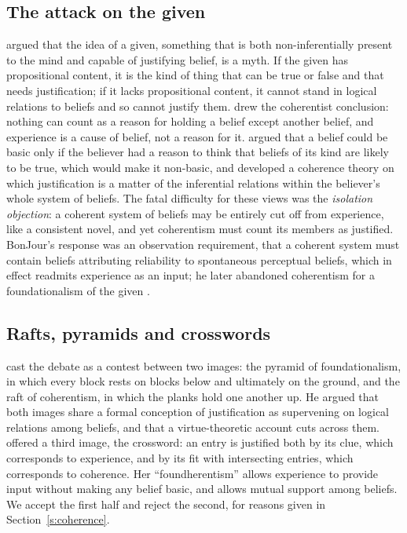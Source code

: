 \documentclass{situationist-preprint}
\begin{document}
\subsection{The attack on the given}

\citet{Sellars1956} argued that the idea of a given, something that is both non-inferentially present to the mind and capable of justifying belief, is a myth. If the given has propositional content, it is the kind of thing that can be true or false and that needs justification; if it lacks propositional content, it cannot stand in logical relations to beliefs and so cannot justify them. \citet{Davidson1986} drew the coherentist conclusion: nothing can count as a reason for holding a belief except another belief, and experience is a cause of belief, not a reason for it. \citet{BonJour1978,BonJour1985} argued that a belief could be basic only if the believer had a reason to think that beliefs of its kind are likely to be true, which would make it non-basic, and developed a coherence theory on which justification is a matter of the inferential relations within the believer's whole system of beliefs. The fatal difficulty for these views was the \emph{isolation objection}: a coherent system of beliefs may be entirely cut off from experience, like a consistent novel, and yet coherentism must count its members as justified. BonJour's response was an observation requirement, that a coherent system must contain beliefs attributing reliability to spontaneous perceptual beliefs, which in effect readmits experience as an input; he later abandoned coherentism for a foundationalism of the given \citep{BonJourSosa2003}.

\subsection{Rafts, pyramids and crosswords}

\citet{Sosa1980} cast the debate as a contest between two images: the pyramid of foundationalism, in which every block rests on blocks below and ultimately on the ground, and the raft of coherentism, in which the planks hold one another up. He argued that both images share a formal conception of justification as supervening on logical relations among beliefs, and that a virtue-theoretic account cuts across them. \citet{Haack1993} offered a third image, the crossword: an entry is justified both by its clue, which corresponds to experience, and by its fit with intersecting entries, which corresponds to coherence. Her \enquote{foundherentism} allows experience to provide input without making any belief basic, and allows mutual support among beliefs. We accept the first half and reject the second, for reasons given in Section~\ref{s:coherence}.
\end{document}
